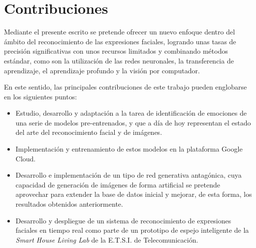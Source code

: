 \section{Contribuciones}

Mediante el presente escrito se pretende ofrecer un nuevo enfoque dentro del ámbito del reconocimiento de las expresiones faciales, logrando unas tasas de precisión significativas con unos recursos limitados y combinando métodos estándar, como son la utilización de las redes neuronales, la transferencia de aprendizaje, el aprendizaje profundo y la visión por computador.
 
En este sentido, las principales contribuciones de este trabajo pueden englobarse en los siguientes puntos:
\begin{itemize}
  \item Estudio, desarrollo y adaptación a la tarea de identificación de emociones de una serie de modelos pre-entrenados, y que a día de hoy representan el estado del arte del reconocimiento facial y de imágenes.
  \item Implementación y entrenamiento de estos modelos en la plataforma Google Cloud.
  \item Desarrollo e implementación de un tipo de red generativa antagónica, cuya capacidad de generación de imágenes de forma artificial se pretende aprovechar para extender la base de datos inicial y mejorar, de esta forma, los resultados obtenidos anteriormente.
  \item Desarrollo y despliegue de un sistema de reconocimiento de expresiones faciales en tiempo real como parte de un prototipo de espejo inteligente de la \textit{Smart House Living Lab} de la E.T.S.I. de Telecomunicación.
\end{itemize}